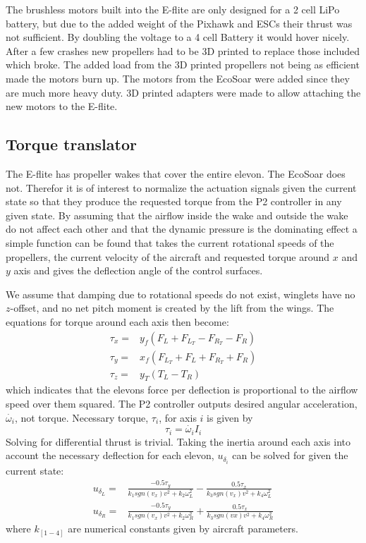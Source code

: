 \documentclass{article}
\begin{document}
The brushless motors built into the E-flite are only designed for a 2 cell LiPo battery, but due to the added weight of the Pixhawk and ESCs their thrust was not sufficient.
By doubling the voltage to a 4 cell Battery it would hover nicely.
After a few crashes new propellers had to be 3D printed to replace those included which broke.
The added load from the 3D printed propellers not being as efficient made the motors burn up.
The motors from the EcoSoar were added since they are much more heavy duty.
3D printed adapters were made to allow attaching the new motors to the E-flite.


\subsection{Torque translator}
The E-flite has propeller wakes that cover the entire elevon.
The EcoSoar does not.
Therefor it is of interest to normalize the actuation signals given the current state so that they produce the requested torque from the P2 controller in any given state.
By assuming that the airflow inside the wake and outside the wake do not affect each other and that the dynamic pressure is the dominating effect a simple function can be found that takes the current rotational speeds of the propellers, the current velocity of the aircraft and requested torque around $x$ and $y$ axis and gives the deflection angle of the control surfaces.

We assume that damping due to rotational speeds do not exist, winglets have no $z$-offset, and no net pitch moment is created by the lift from the wings.
The equations for torque around each axis then become:
\begin{equation}
\begin{split}
    \tau_x =& y_f ( F_L + F_{L_T} - F_{R_T} -F_R) \\
    \tau_y =& x_f ( F_{L_T} + F_L + F_{R_T} + F_R) \\
    \tau_z =& y_T ( T_L - T_R)
\end{split}
\end{equation}
which indicates that the elevons force per deflection is proportional to the airflow speed over them squared.
The P2 controller outputs desired angular acceleration, $\dot{\omega_i}$, not torque.
Necessary torque, $\tau_i$, for axis $i$ is given by
\begin{equation}
    \tau_i = \dot{\omega_i} I_i
\end{equation}
Solving for differential thrust is trivial.
Taking the inertia around each axis into account the necessary deflection for each elevon, $u_{\delta_i}$ can be solved for given the current state:
\begin{equation}
\begin{split}
    u_{\delta_L} =& \frac{-0.5 \tau_y}{k_1 sgn(v_x) v^2 + k_2 \omega_L^2} - \frac{0.5 \tau_x}{k_3 sgn(v_x) v^2 + k_4\omega_L^2} \\
    u_{\delta_R} =& \frac{-0.5 \tau_y}{k_1 sgn(v_x) v^2 + k_2 \omega_R^2} + \frac{0.5 \tau_x}{k_3 sgn(vx) v^2 + k_4 \omega_R^2} 
\end{split}
\end{equation}
where $k_{[1-4]}$ are numerical constants given by aircraft parameters.
\end{document}
